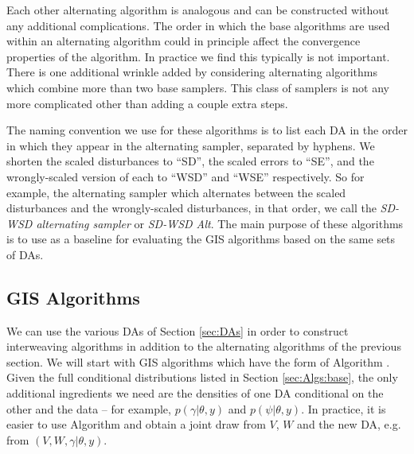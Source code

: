 \documentclass[12pt]{article}
\begin{document}
Each other alternating algorithm is analogous and can be constructed without any additional complications. The order in which the base algorithms are used within an alternating algorithm could in principle affect the convergence properties of the algorithm. In practice we find this typically is not important. There is one additional wrinkle added by considering alternating algorithms which combine more than two base samplers. This class of samplers is not any more complicated other than adding a couple extra steps. 


The naming convention we use for these algorithms is to list each DA in the order in which they appear in the alternating sampler, separated by hyphens. We shorten the scaled disturbances to ``SD'', the scaled errors to ``SE'', and the wrongly-scaled version of each to ``WSD'' and ``WSE'' respectively. So for example, the alternating sampler which alternates between the scaled disturbances and the wrongly-scaled disturbances, in that order, we call the {\it SD-WSD alternating sampler} or {\it SD-WSD Alt}. The main purpose of these algorithms is to use as a baseline for evaluating the GIS algorithms based on the same sets of DAs.

\subsection{GIS Algorithms}\label{sec:Algs:GIS}
We can use the various DAs of Section \ref{sec:DAs} in order to construct interweaving algorithms in addition to the alternating algorithms of the previous section. We will start with GIS algorithms which have the form of Algorithm . Given the full conditional distributions listed in Section \ref{sec:Algs:base}, the only additional ingredients we need are the densities of one DA conditional on the other and the data -- for example, $p(\gamma|\theta,y)$ and $p(\psi|\theta,y)$. In practice, it is easier to use Algorithm  and obtain a joint draw from $V$, $W$ and the new DA, e.g. from $(V,W,\gamma|\theta,y)$.
\end{document}
